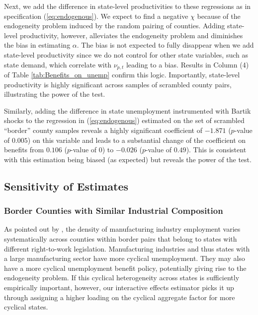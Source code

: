 \documentclass[12pt]{article}
\newcommand{\1}{\mathbf{1}}
\begin{document}
Next, we add the difference in state-level productivities to these regressions as in specification (\ref{eq:endogenous}). We expect to find a negative $\chi$ because of the endogeneity problem induced by the random pairing of counties. Adding state-level productivity, however, alleviates the endogeneity problem and diminishes the bias in estimating $\alpha$. The bias is not expected to fully disappear when we add state-level productivity since we do not control for other state variables, such as state demand, which correlate with $\nu_{p,t}$ leading to a bias. Results in Column (4) of Table \ref{tab:Benefits_on_unemp} confirm this logic. Importantly, state-level productivity is highly significant across samples of scrambled county pairs, illustrating the power of the test.

Similarly, adding the difference in state unemployment instrumented with Bartik shocks to the regression in (\ref{eq:endogenous}) estimated on the set of scrambled  ``border'' county samples reveals a highly significant coefficient of $-1.871$ ($p$-value of $0.005$) on this variable and leads to a substantial change of the coefficient on benefits from $0.106$ ($p$-value of $0$) to $-0.026$ ($p$-value of $0.49$). This is consistent with this estimation being biased (as expected) but reveals the power of the test.







\subsection{Sensitivity of Estimates}


\subsubsection{Border Counties with Similar Industrial Composition}
As pointed out by \citet{holmes:98}, the density of manufacturing industry employment varies systematically across counties within border pairs that belong to states with different right-to-work legislation. Manufacturing industries and thus states with a large manufacturing sector have more cyclical unemployment. They may also have a more cyclical unemployment benefit policy, potentially giving rise to the endogeneity problem. If this cyclical heterogeneity across states is sufficiently empirically important, however, our interactive effects estimator picks it up through assigning a higher loading on the cyclical aggregate factor for more cyclical states.
\end{document}
